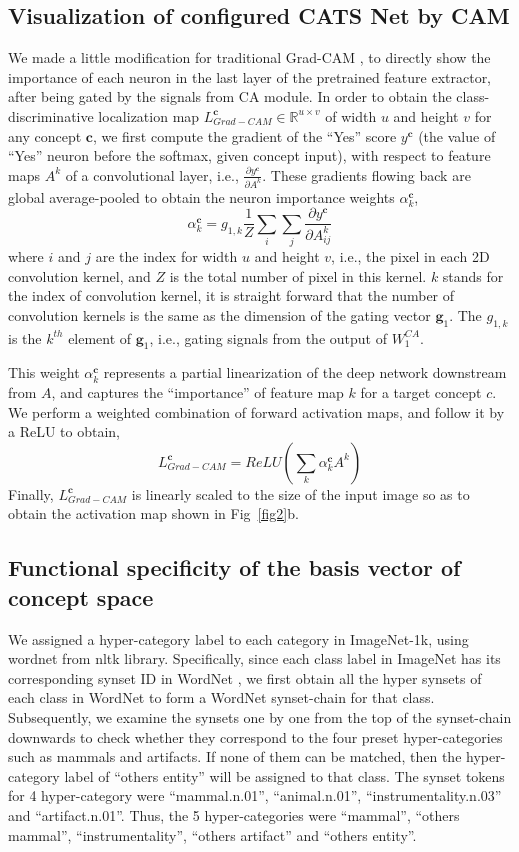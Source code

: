 \documentclass[pdflatex,sn-mathphys-num,lineno]{sn-jnl}%
\begin{document}
\begin{CJK}{UTF8}{gbsn}
\subsection{Visualization of configured CATS Net by CAM}
We made a little modification for traditional Grad-CAM \cite{selvaraju_grad-cam_2017}, to directly show the importance of each neuron in the last layer of the pretrained feature extractor, after being gated by the signals from CA module. In order to obtain the class-discriminative localization map $L_{Grad-CAM}^{\mathbf{c}} \in \mathbb{R}^{u \times v}$ of width $u$ and height $v$ for any concept $\mathbf{c}$, we first compute the gradient of the “Yes” score $y^\mathbf{c}$ (the value of “Yes” neuron before the softmax, given concept input), with respect to feature maps $A^k$ of a convolutional layer, i.e., $\frac{\partial y^\mathbf{c}}{\partial A^k}$. These gradients flowing back are global average-pooled to obtain the neuron importance weights $\alpha_k^\mathbf{c}$,
$$\alpha_k^\mathbf{c} = g_{1, k} \frac{1}{Z} \sum_i \sum_j \frac{\partial y^\mathbf{c}}{\partial A^k_{ij}}$$
where $i$ and $j$ are the index for width $u$ and height $v$, i.e., the pixel in each 2D convolution kernel, and $Z$ is the total number of pixel in this kernel. $k$ stands for the index of convolution kernel, it is straight forward that the number of convolution kernels is the same as the dimension of the gating vector $\mathbf{g}_1$. The $g_{1, k}$ is the $k^{th}$ element of $\mathbf{g}_1$, i.e., gating signals from the output of $W_1^{CA}$. 

This weight $\alpha_k^\mathbf{c}$ represents a partial linearization of the deep network downstream from $A$, and captures the “importance” of feature map $k$ for a target concept $c$. We perform a weighted combination of forward activation maps, and follow it by a ReLU to obtain,
$$L_{Grad-CAM}^{\mathbf{c}} = ReLU(\sum_k \alpha_k^\mathbf{c} A^k)$$ Finally, $L_{Grad-CAM}^{\mathbf{c}}$ is linearly scaled to the size of the input image so as to obtain the activation map shown in Fig~\ref{fig2}b.

\subsection{Functional specificity of the basis vector of concept space}
We assigned a hyper-category label to each category in ImageNet-1k, using wordnet from nltk library. Specifically, since each class label in ImageNet has its corresponding synset ID in WordNet \cite{fellbaum_wordnet_1998}, we first obtain all the hyper synsets of each class in WordNet to form a WordNet synset-chain for that class. Subsequently, we examine the synsets one by one from the top of the synset-chain downwards to check whether they correspond to the four preset hyper-categories such as mammals and artifacts. If none of them can be matched, then the hyper-category label of “others entity” will be assigned to that class. The synset tokens for 4 hyper-category were “mammal.n.01”, “animal.n.01”, “instrumentality.n.03” and “artifact.n.01”. Thus, the 5 hyper-categories were “mammal”, “others mammal”, “instrumentality”, “others artifact” and “others entity”.


\end{CJK}
\end{document}
